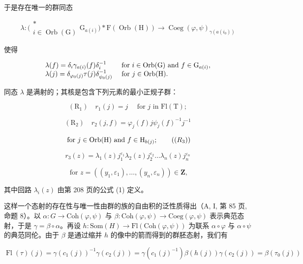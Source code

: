 于是存在唯一的群同态

\[
\lambda \colon \bigl ( \begin{array}{c} * \\ i \in \operatorname{Orb} (\mathrm{G}) \end{array} \mathrm{G} _ {a (i)} \bigr) * \mathrm{F} (\operatorname{Orb} (\mathrm{H})) \to \operatorname{Coeg} (\varphi , \psi) _ {\gamma (a (i _ {0}))}
\]

使得

\[
\begin{array}{l l} \lambda (f) = \delta_ {i} \gamma_ {a (i)} (f) \delta_ {i} ^ {- 1} & \text { for } i \in \mathrm{Orb(G)} \text { and } f \in \mathrm{G} _ {a (i)}, \\ \lambda (j) = \delta_ {\varphi_ {0} (j)} \tau (j) \delta_ {\psi_ {0} (j)} ^ {- 1} & \text { for } j \in \mathrm{Orb(H)}. \end{array}
\]

同态 \(\lambda\) 是满射的；其核是包含下列元素的最小正规子群：

\[
\left(\mathrm{R} _ {1}\right) \quad r _ {1} (j) = j \quad \text { for } j \text { in } \mathrm{Fl} (\mathrm{T});
\]

\[
(\mathrm{R} _ {2}) \quad r _ {2} (j, f) = \varphi_ {j} (f) j \psi_ {j} (f) ^ {- 1} j ^ {- 1}
\]

\[
\text { for } j \in \operatorname{Orb} (\mathrm{H}) \text { and } f \in \mathrm{H} _ {b (j)};\tag{\((R_{3})\)}
\]

\[
r _ {3} (z) = \lambda_ {1} (z) j _ {1} ^ {\varepsilon_ {1}} \lambda_ {2} (z) j _ {2} ^ {\varepsilon_ {2}} \dots \lambda_ {n} (z) j _ {n} ^ {\varepsilon_ {n}}
\]

\[
\text { for } z = ((y _ {1}, \varepsilon_ {1}), \dots , (y _ {n}, \varepsilon_ {n})) \in \mathbf {Z},
\]

其中回路 \(\lambda_{i}(z)\) 由第 208 页的公式 (1) 定义。

这样一个态射的存在性与唯一性由群的族的自由积的泛性质得出（A, I, 第 85 页, 命题 8）。以 \(\alpha\colon G\to\mathrm{Coh}(\varphi,\psi)\) 与 \(\beta\colon\mathrm{Coh}(\varphi,\psi)\to\mathrm{Coeg}(\varphi,\psi)\) 表示典范态射，于是 \(\gamma=\beta\circ\alpha\)。再设 \(h\colon\mathrm{Som}(H)\to\mathrm{Fl}(\mathrm{Coh}(\varphi,\psi))\) 为联系 \(\alpha\circ\varphi\) 与 \(\alpha\circ\psi\) 的典范同伦。由于 \(\beta\) 是通过缩并 \(h\) 的像中的箭而得到的群胚态射，我们有

\[
\operatorname{Fl} (\tau) (j) = \gamma (c _ {1} (j)) ^ {- 1} \gamma (c _ {2} (j)) = \gamma (c _ {1} (j) ^ {- 1}) \beta (h (j)) \gamma (c _ {2} (j)) = \beta (\tau_ {0} (j))
\]

